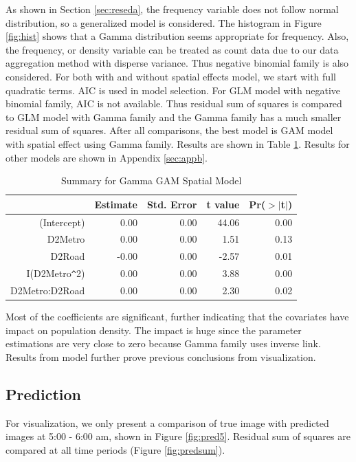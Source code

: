 \documentclass[hidelinks,12pt]{article}
\begin{document}
	As shown in Section \ref{sec:reseda}, the frequency variable does not follow normal distribution, so a generalized model is considered. The histogram in Figure \ref{fig:hist} shows that a Gamma distribution seems appropriate for frequency. Also, the frequency, or density variable can be treated as count data due to our data aggregation method with disperse variance. Thus negative binomial family is also considered. For both with and without spatial effects model, we start with full quadratic terms. AIC is used in model selection. For GLM model with negative binomial family, AIC is not available. Thus residual sum of squares is compared to GLM model with Gamma family and the Gamma family has a much smaller residual sum of squares. After all comparisons, the best model is GAM model with spatial effect using Gamma family. Results are shown in Table \ref{tbl:bestx}. Results for other models are shown in Appendix \ref{sec:appb}.	
	\begin{table}[ht]
		\centering
		\caption{Summary for Gamma GAM Spatial Model \label{tbl:bestx}}
		\begin{tabular}{rrrrr}
			\hline
			& Estimate & Std. Error & t value & Pr($>$$|$t$|$) \\ 
			\hline
			(Intercept) & 0.00 & 0.00 & 44.06 & 0.00 \\ 
			D2Metro & 0.00 & 0.00 & 1.51 & 0.13 \\ 
			D2Road & -0.00 & 0.00 & -2.57 & 0.01 \\ 
			I(D2Metro\verb|^|2) & 0.00 & 0.00 & 3.88 & 0.00 \\ 
			D2Metro:D2Road & 0.00 & 0.00 & 2.30 & 0.02 \\ 
			\hline
		\end{tabular}
	\end{table}

	Most of the coefficients are significant, further indicating that the covariates have impact on population density. The impact is huge since the parameter estimations are very close to zero because Gamma family uses inverse link. Results from model further prove previous conclusions from visualization.
	
	\subsection{Prediction}
	For visualization, we only present a comparison of true image with predicted images at 5:00 - 6:00 am, shown in Figure \ref{fig:pred5}. Residual sum of squares are compared at all time periods (Figure \ref{fig:predsum}).\\	
	
\end{document}
